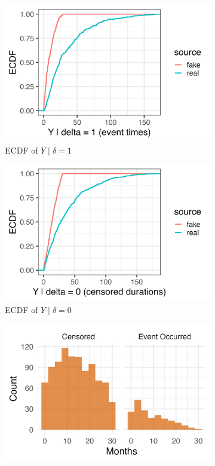 \begin{figure}[htbp]
\centering
\begin{subfigure}[t]{0.32\textwidth}
  \centering
  \includegraphics[width=\linewidth]{images/ppc_event_ecdf_A30.png}  %
  \caption{ECDF of $Y \mid \delta=1$}
  \label{fig:ecdf-event_a30}
\end{subfigure}\hfill
\begin{subfigure}[t]{0.32\textwidth}
  \centering
  \includegraphics[width=\linewidth]{images/ppc_censored_ecdf_A30.png}   
  \caption{ECDF of $Y \mid \delta=0$}
  \label{fig:ecdf-cens_a30}
\end{subfigure}\hfill
\begin{subfigure}[t]{0.35\textwidth}
  \centering
  \includegraphics[width=\linewidth]{images/fake_duration_hist_a30.png}   %

\end{subfigure}
\end{figure}
